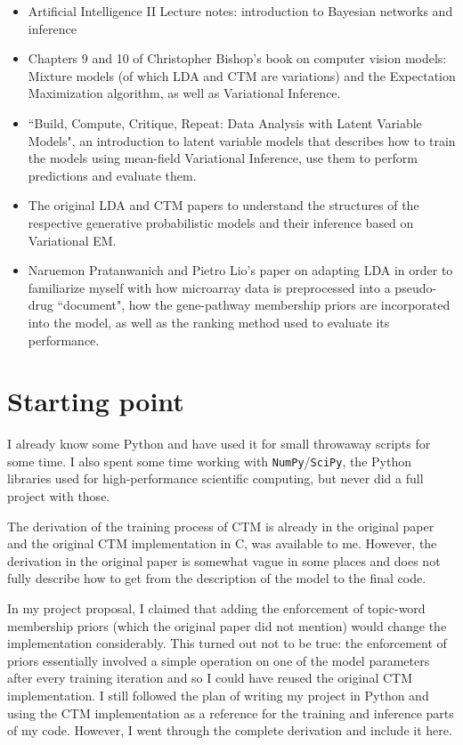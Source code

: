 \documentclass[12pt,a4paper,twoside,openright]{report}
\begin{document}
\begin{itemize}[noitemsep]
\item Artificial Intelligence II Lecture notes: introduction to Bayesian networks and inference
\item Chapters 9 and 10 of Christopher Bishop's book\cite{Bishop:2006:PRM:1162264} on computer vision models: Mixture models (of which LDA and CTM are variations) and the Expectation Maximization algorithm, as well as Variational Inference.
\item ``Build, Compute, Critique, Repeat: Data Analysis with Latent Variable Models"\cite{doi:10.1146/annurev-statistics-022513-115657}, an introduction to latent variable models that describes how to train the models using mean-field Variational Inference, use them to perform predictions and evaluate them.
\item The original LDA\cite{Blei} and CTM\cite{2007} papers to understand the structures of the respective generative probabilistic models and their inference based on Variational EM.
\item Naruemon Pratanwanich and Pietro Lio's paper\cite{Pratanwanich2014}  on adapting LDA in order to familiarize myself with how microarray data is preprocessed into a pseudo-drug ``document", how the gene-pathway membership priors are incorporated into the model, as well as the ranking method used to evaluate its performance.
\end{itemize}

\section{Starting point}

I already know some Python and have used it for small throwaway scripts for some time. I also spent some time working with \texttt{NumPy}/\texttt{SciPy}, the Python libraries used for high-performance scientific computing, but never did a full project with those.

The derivation of the training process of CTM is already in the original paper \cite{Blei} and the original CTM implementation in C, was available to me. However, the derivation in the original paper is somewhat vague in some places and does not fully describe how to get from the description of the model to the final code.

In my project proposal, I claimed that adding the enforcement of topic-word membership priors (which the original paper did not mention) would change the implementation considerably. This turned out not to be true: the enforcement  of priors essentially involved a simple operation on one of the model parameters after every training iteration and so I could have reused the original CTM implementation. I still followed the plan of writing my project in Python and using the CTM implementation as a reference for the training and inference parts of my code. However, I went through the complete derivation and include it here.
\end{document}
